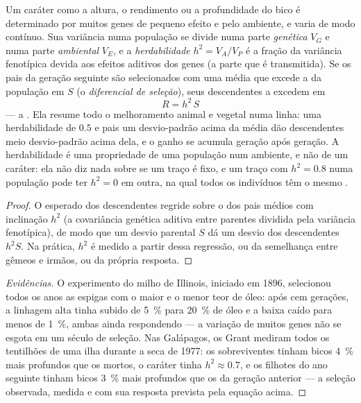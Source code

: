 \begin{theorem}\label{thm:b2:population-genetics:heritability}
Um caráter como a altura, o rendimento ou a profundidade do bico é
determinado por muitos genes de pequeno efeito e pelo ambiente, e varia
de modo contínuo. Sua variância numa população se divide numa parte
\emph{genética} $V_G$ e numa parte \emph{ambiental} $V_E$, e
a \emph{herdabilidade} $h^{2} = V_A/V_P$ é a fração da variância
fenotípica devida aos efeitos aditivos dos genes (a parte que é
transmitida). Se os pais da geração seguinte são selecionados com uma
média que excede a da população em $S$ (o \emph{diferencial de
seleção}), seus descendentes a excedem em
\[
R = h^{2}\,S
\]
--- a \emph{}. Ela resume todo o melhoramento animal e
vegetal numa linha: uma herdabilidade de $0.5$ e pais um desvio-padrão
acima da média dão descendentes meio desvio-padrão acima dela, e o ganho
se acumula geração após geração. A herdabilidade é uma propriedade de
uma população num ambiente, e não de um caráter: ela não diz nada sobre
se um traço é fixo, e um traço com $h^{2} = 0.8$ numa população pode
ter $h^{2} = 0$ em outra, na qual todos os indivíduos têm o mesmo
.
\end{theorem}
\begin{proof}
O  esperado dos descendentes regride sobre o dos pais médios
com inclinação $h^{2}$ (a covariância genética aditiva entre parentes
dividida pela variância fenotípica), de modo que um desvio parental $S$
dá um desvio dos descendentes $h^{2}S$. Na prática, $h^{2}$ é medido a
partir dessa regressão, ou da semelhança entre gêmeos e irmãos, ou da
própria resposta.
\end{proof}
\begin{proof}[Evidências]
O experimento do milho de Illinois, iniciado em 1896, selecionou todos
os anos as espigas com o maior e o menor teor de óleo: após cem gerações,
a linhagem alta tinha subido de \qty{5}{\%} para \qty{20}{\%} de óleo e
a baixa caído para menos de \qty{1}{\%}, ambas ainda respondendo --- a
variação de muitos genes não se esgota em um século de seleção. Nas
Galápagos, os Grant mediram todos os tentilhões de uma ilha durante a
seca de 1977: os sobreviventes tinham bicos \qty{4}{\%} mais profundos
que os mortos, o caráter tinha $h^{2}
\approx 0.7$, e os filhotes do ano seguinte tinham bicos
\qty{3}{\%} mais profundos que os da geração anterior --- a seleção
observada, medida e com sua resposta prevista pela equação
acima.
\end{proof}


